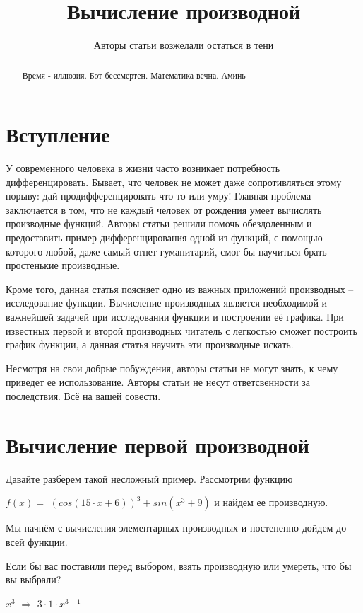 \documentclass{article}
\title{Вычисление производной}
\author{Авторы статьи возжелали остаться в тени}
\begin{document}
\maketitle

\begin{abstract}
	Время - иллюзия. Бот бессмертен. Математика вечна. Аминь
\end{abstract}

\section{Вступление}

У современного человека в жизни часто возникает потребность дифференцировать. Бывает, что человек не может даже сопротивляться этому порыву: дай продифференцировать что-то или умру! Главная проблема заключается в том, что не каждый человек от рождения умеет вычислять производные функций. Авторы статьи решили помочь обездоленным и предоставить пример дифференцирования одной из функций, с помощью которого любой, даже самый отпет гуманитарий, смог бы научиться брать простенькие производные.

Кроме того, данная статья поясняет одно из важных приложений производных -- исследование функции. Вычисление производных является необходимой и важнейшей задачей при исследовании функции и построении её графика. При известных первой и второй производных читатель с легкостью сможет построить график функции, а данная статья научить эти производные искать.

Несмотря на свои добрые побуждения, авторы статьи не могут знать, к чему приведет ее использование. Авторы статьи не несут ответсвенности за последствия. Всё на вашей совести.

\section{Вычисление первой производной}

Давайте разберем такой несложный пример. Рассмотрим функцию 

$f(x) = $ $( cos (15 \cdot x + 6)) ^ {3} +  sin (x ^ {3} + 9)$ и найдем ее производную.

Мы начнём с вычисления элементарных производных и постепенно дойдем до всей функции.

Если бы вас поставили перед выбором, взять производную или умереть, что бы вы выбрали?

$x ^ {3}$ $\Rightarrow$ $3 \cdot 1 \cdot x ^ {3 - 1}$
\end{document}
